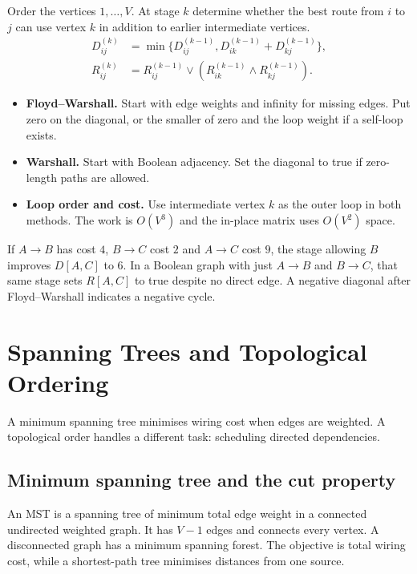 \documentclass[12pt,a4paper]{article}
\begin{document}
\begin{tcolorbox}[formulabox, title={Two forms of the intermediate-vertex recurrence}]
Order the vertices $1,\dots,V$. At stage $k$ determine whether the best route from $i$ to $j$ can use vertex $k$ in addition to earlier intermediate vertices.
\begin{align*}
D^{(k)}_{ij}
 &=\min\{D^{(k-1)}_{ij},D^{(k-1)}_{ik}+D^{(k-1)}_{kj}\},\\
R^{(k)}_{ij}
 &=R^{(k-1)}_{ij}\lor
   (R^{(k-1)}_{ik}\land R^{(k-1)}_{kj}).
\end{align*}
\begin{itemize}[leftmargin=*, itemsep=2pt]
  \item \textbf{Floyd--Warshall.} Start with edge weights and infinity for missing edges. Put zero on the diagonal, or the smaller of zero and the loop weight if a self-loop exists.
  \item \textbf{Warshall.} Start with Boolean adjacency. Set the diagonal to true if zero-length paths are allowed.
  \item \textbf{Loop order and cost.} Use intermediate vertex $k$ as the outer loop in both methods. The work is $O(V^3)$ and the in-place matrix uses $O(V^2)$ space.
\end{itemize}
\end{tcolorbox}

\begin{tcolorbox}[examplebox, title={Intermediate vertex update}]
If $A\to B$ has cost $4$, $B\to C$ cost $2$ and $A\to C$ cost $9$, the stage allowing $B$ improves $D[A,C]$ to $6$. In a Boolean graph with just $A\to B$ and $B\to C$, that same stage sets $R[A,C]$ to true despite no direct edge. A negative diagonal after Floyd--Warshall indicates a negative cycle.
\end{tcolorbox}

\section{Spanning Trees and Topological Ordering}
A minimum spanning tree minimises wiring cost when edges are weighted. A topological order handles a different task: scheduling directed dependencies.
\subsection{Minimum spanning tree and the cut property}
\begin{tcolorbox}[defbox, title={Minimum spanning tree}]
An MST is a spanning tree of minimum total edge weight in a connected undirected weighted graph. It has $V-1$ edges and connects every vertex. A disconnected graph has a minimum spanning forest. The objective is total wiring cost, while a shortest-path tree minimises distances from one source.
\end{tcolorbox}
\end{document}
